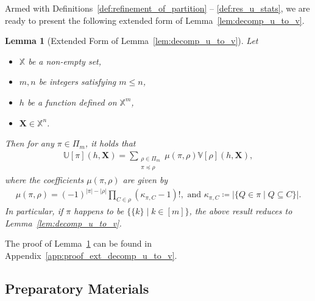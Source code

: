 \documentclass[sn-mathphys, natbib=false]{sn-jnl}
\theoremstyle{plain}
\newtheorem{lemma}{Lemma}
\theoremstyle{definition}
\newcommand{\sPi}{\pi}
\newcommand{\ustat}{\mathbb{U}}
\newcommand{\vstat}{\mathbb{V}}
\newcommand{\samplespace}{\bbX}
\newcommand{\partition}{\Pi}
\newcommand{\partitionp}[1]{\partition_{#1}}
\newcommand{\pleq}{\preceq}
\def\bbX{\mathbb{X}}
\begin{document}
\begin{bibunit}[agsm]
Armed with Definitions~\ref{def:refinement_of_partition} -- \ref{def:res_u_stats}, we are ready to present the following extended form of Lemma~\ref{lem:decomp_u_to_v}. 

\begin{lemma}[Extended Form of Lemma~\ref{lem:decomp_u_to_v}]
\label{lem:ext_decomp_u_to_v}
    Let
    \begin{itemize}
        \item $\samplespace$ be a non-empty set,
        \item $m,n$ be integers satisfying $m \leq n$,
        \item $h$ be a function defined on $\samplespace^m$,
        \item $\bm{X} \in \samplespace^n$. 
    \end{itemize}
    Then for any $\sPi \in \partitionp{m}$, it holds that
    \begin{align*}
        \ustat[\sPi](h,\bm{X}) 
        = \sum_{\substack{ \rho \in \partitionp{m} \\ \sPi \pleq \rho }}  
        \mu(\sPi, \rho)  \vstat[\rho](h, \bm{X}),
    \end{align*}
    where the coefficients $\mu(\sPi, \rho)$ are given by
    \begin{align*}
        \mu(\sPi, \rho) 
        = (-1)^{|\sPi|-|\rho|} 
        \prod_{C \in \rho} (\kappa_{\sPi, C} - 1)!, \text{ and } \kappa_{\sPi, C} \coloneqq |\{ Q \in \sPi \mid Q \subseteq C \}|.
    \end{align*}
    In particular, if $\sPi$ happens to be $\{\{k\} \mid k \in [m]\}$, the above result reduces to Lemma~\ref{lem:decomp_u_to_v}. 
\end{lemma}

The proof of Lemma~\ref{lem:ext_decomp_u_to_v} can be found in Appendix~\ref{app:proof_ext_decomp_u_to_v}.

\subsection{Preparatory Materials}\label{app:preparatory_materials}


\end{bibunit}
\end{document}
